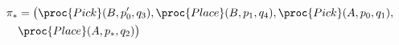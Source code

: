 \documentclass[letterpaper]{article} %
\newcommand\note[1]{\todo[inline, color=blue!10, linecolor=blue!90,
  size=\footnotesize]{\linespread{0.9}\selectfont{{\bf CRG:} #1}\par}}
\theoremstyle{plain}\newtheorem{thm}{Theorem}
\theoremstyle{definition}\newtheorem{defn}{Definition}
\theoremstyle{plain}\newtheorem{lem}{Lemma}
\theoremstyle{plain}\newtheorem{cor}{Corollary}
\newcommand{\algname}{{\sc strips}tream}
\begin{document}
\begin{footnotesize}
\begin{align*}
\pi_* &=  \big(\proc{Pick}(B, p_0', q_3), \proc{Place}(B, p_1, q_4), \proc{Pick}(A, p_0, q_1), \\
& \proc{Place}(A, p_*, q_2)\big)
\end{align*}
\end{footnotesize}
%
%
%
\end{document}
